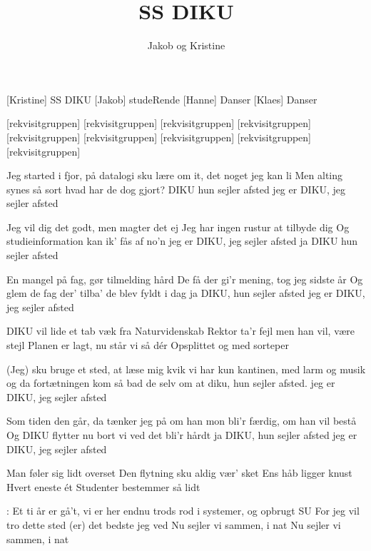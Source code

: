 \documentclass[a4paper,11pt]{article}
\title{SS DIKU}
\author{Jakob og Kristine}
\begin{document}
\maketitle

\begin{roles}  
[Kristine] SS DIKU
[Jakob] studeRende
[Hanne] Danser
[Klaes] Danser
\end{roles}

\begin{props}  
[rekvisitgruppen] 
[rekvisitgruppen]
[rekvisitgruppen]
[rekvisitgruppen] 
[rekvisitgruppen] 
[rekvisitgruppen] 
 [rekvisitgruppen] 
 [rekvisitgruppen] 
 [rekvisitgruppen] 
\end{props}

\begin{song}
   Jeg started i fjor, på datalogi
   sku lære om it, det noget jeg kan li
   Men alting synes så sort
   hvad har de dog gjort? 
   DIKU hun sejler afsted
 jeg er DIKU, jeg sejler afsted 

 Jeg vil dig det godt, men magter det ej
   Jeg har ingen rustur at tilbyde dig
   Og studieinformation
   kan ik' fås af no'n
   jeg er DIKU, jeg sejler afsted
 ja DIKU hun sejler afsted

 En mangel på fag, gør tilmelding hård
   De få der gi'r mening, tog jeg sidste år
   Og glem de fag der' tilba'
   de blev fyldt i dag
 ja DIKU, hun sejler afsted
 jeg er DIKU, jeg sejler afsted

 DIKU vil lide et tab
   væk fra Naturvidenskab
 Rektor ta'r fejl
   men han vil, 
 være stejl
 Planen er lagt, nu står vi så dér
 Opsplittet
 og med sorteper

 (Jeg) sku bruge et sted, at læse mig kvik
 vi har kun kantinen, med larm og musik
 og da fortætningen kom
   så bad de selv om
   at diku, hun sejler afsted.
 jeg er DIKU, jeg sejler afsted

 Som tiden den går, da tænker jeg på
   om han mon bli'r færdig, om han vil bestå
 Og DIKU flytter nu bort
   vi ved det bli'r hårdt
   ja DIKU, hun sejler afsted
 jeg er DIKU, jeg sejler afsted


 Man føler sig lidt overset
 Den flytning sku aldig vær' sket
 Ens håb ligger knust
 Hvert eneste ét
   Studenter bestemmer så lidt

: Et ti år er gå't, vi er her endnu
   trods rod i systemer, og opbrugt SU
   For jeg vil tro dette sted
   (er) det bedste jeg ved
   Nu sejler vi sammen, i nat
   Nu sejler vi sammen, i nat


\end{song}
\end{document}
